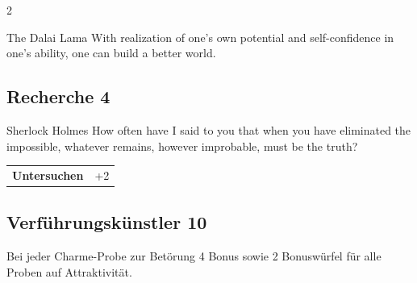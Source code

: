 \begin{multicols}{2}
\begin{tcolorbox}
\begin{pquote}{The Dalai Lama}
With realization of one’s own potential and self-confidence in one’s ability, one can build a better world.
\end{pquote}

\vspace{3mm}



\end{tcolorbox}

\begin{tcolorbox}
    \subsection*{Recherche \hfill \small{4 }}
    \tcblower


\begin{pquote}{Sherlock Holmes}
How often have I said to you that when you have eliminated the impossible, whatever remains, however improbable, must be the truth?
\end{pquote}

\vspace{3mm}

\begin{tabular}{@{}ll@{}}
    \textbf{Untersuchen} & +2\\
\end{tabular}


\end{tcolorbox}

\begin{tcolorbox}
    \subsection*{Verführungskünstler \hfill \small{10 }}
    \tcblower
Bei jeder Charme-Probe zur Betörung 4 Bonus sowie 2 Bonuswürfel für alle Proben auf Attraktivität.


\vspace{3mm}



\end{tcolorbox}
\end{multicols}
